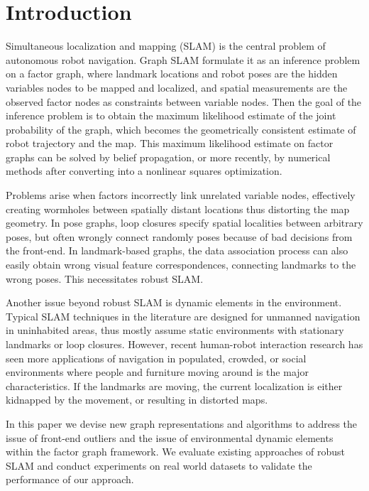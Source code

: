 \section{Introduction}
Simultaneous localization and mapping (SLAM) is the central problem of
autonomous robot navigation. Graph SLAM formulate it as an inference problem
on a factor graph, where landmark locations and robot poses are the hidden
variables nodes to be mapped and localized, and spatial measurements are the
observed factor nodes as constraints between variable nodes. Then the goal of
the inference problem is to obtain the maximum likelihood estimate of the
joint probability of the graph, which becomes the geometrically consistent
estimate of robot trajectory and the map. This maximum likelihood estimate on
factor graphs can be solved by belief propagation, or more recently, by
numerical methods after converting into a nonlinear squares optimization.

Problems arise when factors incorrectly link unrelated variable nodes,
effectively creating wormholes between spatially distant locations thus
distorting the map geometry. In pose graphs, loop closures specify spatial
localities between arbitrary poses, but often wrongly connect randomly poses
because of bad decisions from the front-end.  In landmark-based graphs, the
data association process can also easily obtain wrong visual feature
correspondences, connecting landmarks to the wrong poses. This necessitates
robust SLAM.

Another issue beyond robust SLAM is dynamic elements in the environment.
Typical SLAM techniques in the literature are designed for unmanned navigation
in uninhabited areas, thus mostly assume static environments with stationary
landmarks or loop closures. However, recent human-robot interaction research
has seen more applications of navigation in populated, crowded, or social
environments where people and furniture moving around is the major
characteristics. If the landmarks are moving, the current localization is either
kidnapped by the movement, or resulting in distorted maps.

In this paper we devise new graph representations and algorithms to
address the issue of front-end outliers and the issue of environmental
dynamic elements within the factor graph framework. We evaluate existing
approaches of robust SLAM and conduct experiments on real world datasets to
validate the performance of our approach.
